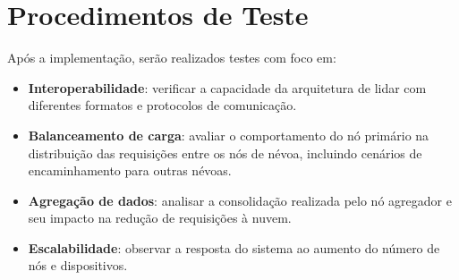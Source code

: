 \section{Procedimentos de Teste}

Após a implementação, serão realizados testes com foco em:
\begin{itemize}
    \item \textbf{Interoperabilidade}: verificar a capacidade da arquitetura de lidar com diferentes formatos e protocolos de comunicação.
    \item \textbf{Balanceamento de carga}: avaliar o comportamento do nó primário na distribuição das requisições entre os nós de névoa, incluindo cenários de encaminhamento para outras névoas.
    \item \textbf{Agregação de dados}: analisar a consolidação realizada pelo nó agregador e seu impacto na redução de requisições à nuvem.
    \item \textbf{Escalabilidade}: observar a resposta do sistema ao aumento do número de nós e dispositivos.
\end{itemize}
